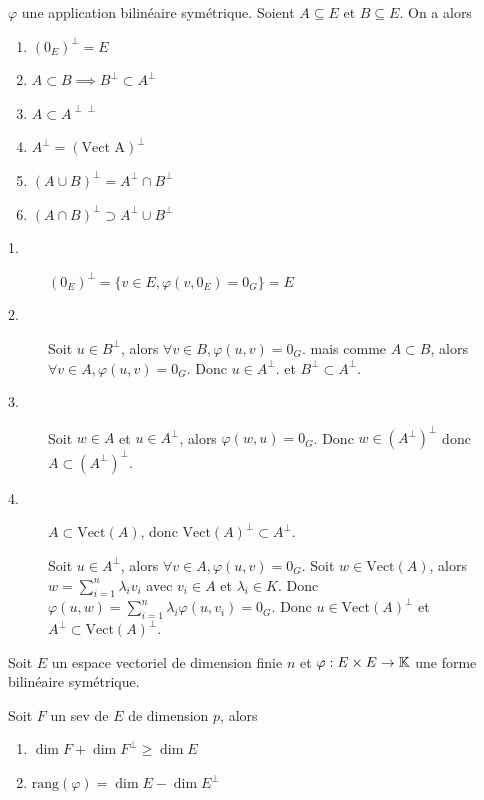 \documentclass[a4paper,12pt]{article}
\begin{document}
\begin{proposition}{}{}
    $\varphi$ une application bilinéaire symétrique.
    Soient $A \subseteq E$ et $B \subseteq E$. On a alors
    \begin{enumerate}
        \item $(0_E)^\perp = E$
        \item $A \subset B \implies B^\perp \subset A^\perp$
        \item $A \subset A^{\perp\perp}$
        \item $A^\perp = (\text{Vect A})^\perp$
        \item $(A \cup B)^\perp = A^\perp \cap B^\perp$
        \item $(A \cap B)^\perp \supset A^\perp \cup B^\perp$
    \end{enumerate}
\end{proposition}

\begin{demonstration}
    \begin{description}
        \item[1.]
        $(0_E)^\perp = \{v \in E, \varphi(v, 0_E) = 0_G\} = E$
    
        \item[2.]
        Soit $u \in B^\perp$, alors $\forall v \in B, \varphi(u, v) = 0_G$.
        mais comme $A \subset B$, alors $\forall v \in A, \varphi(u, v) = 0_G$.
        Donc $u \in A^\perp$. et $B^\perp \subset A^\perp$.

        \item[3.]
        Soit $w \in A$ et $u \in A^\perp$, alors $\varphi(w, u) = 0_G$.
        Donc $w \in (A^{\perp})^\perp$ donc $A \subset (A^{\perp})^\perp$.

        \item[4.]
        $A \subset \text{Vect}(A)$, donc $\text{Vect}(A)^\perp \subset A^\perp$.

        Soit $u \in A^\perp$, alors $\forall v \in A, \varphi(u, v) = 0_G$.
        Soit $w \in \text{Vect}(A)$, alors $w = \sum_{i=1}^n \lambda_i v_i$ avec $v_i \in A$ et $\lambda_i \in K$.
        Donc $\varphi(u, w) = \sum_{i=1}^n \lambda_i \varphi(u, v_i) = 0_G$.
        Donc $u \in \text{Vect}(A)^\perp$ et $A^\perp \subset \text{Vect}(A)^\perp$.

    \end{description}
\end{demonstration}

\begin{proposition}{}{}
    Soit $E$ un espace vectoriel de dimension finie $n$ et $\varphi: E \times E \to \mathbb{K}$ une forme bilinéaire symétrique.

    Soit $F$ un sev de $E$ de dimension $p$, alors
    \begin{enumerate}
        \item $\dim F + \dim F^\perp \geq \dim E$
        \item $\text{rang}(\varphi) = \dim E - \dim E^\perp$
    \end{enumerate}
\end{proposition}
\end{document}
